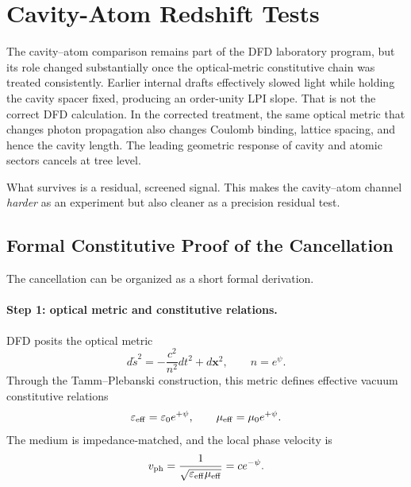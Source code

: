
\section{Cavity-Atom Redshift Tests}\label{sec:cavity}

The cavity--atom comparison remains part of the DFD laboratory program, but its role changed substantially once the optical-metric constitutive chain was treated consistently.  Earlier internal drafts effectively slowed light while holding the cavity spacer fixed, producing an order-unity LPI slope.  That is not the correct DFD calculation.  In the corrected treatment, the same optical metric that changes photon propagation also changes Coulomb binding, lattice spacing, and hence the cavity length.  The leading geometric response of cavity and atomic sectors cancels at tree level.

What survives is a residual, screened signal.  This makes the cavity--atom channel \emph{harder} as an experiment but also cleaner as a precision residual test.

\subsection{Formal Constitutive Proof of the Cancellation}\label{sec:cavity-proof}

The cancellation can be organized as a short formal derivation.

\paragraph{Step 1: optical metric and constitutive relations.}
DFD posits the optical metric
\begin{equation}\label{eq:optical-metric-cavity}
d\tilde s^2=-\frac{c^2}{n^2}dt^2+d\mathbf{x}^2,
\qquad n=e^{\psi}.
\end{equation}
Through the Tamm--Plebanski construction, this metric defines effective vacuum constitutive relations
\begin{equation}\label{eq:tamm-plebanski}
\varepsilon_{\rm eff}=\varepsilon_0 e^{+\psi},
\qquad
\mu_{\rm eff}=\mu_0 e^{+\psi}.
\end{equation}
The medium is impedance-matched, and the local phase velocity is
\begin{equation}
v_{\rm ph}=\frac{1}{\sqrt{\varepsilon_{\rm eff}\mu_{\rm eff}}}=ce^{-\psi}.
\end{equation}

